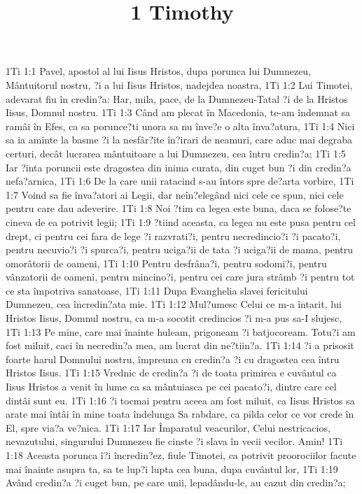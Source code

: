 

\title{1 Timothy}

1Ti 1:1  Pavel, apostol al lui Iisus Hristos, dupa porunca lui Dumnezeu, Mântuitorul nostru, ?i a lui Iisus Hristos, nadejdea noastra,
1Ti 1:2  Lui Timotei, adevarat fiu în credin?a: Har, mila, pace, de la Dumnezeu-Tatal ?i de la Hristos Iisus, Domnul nostru.
1Ti 1:3  Când am plecat în Macedonia, te-am îndemnat sa ramâi în Efes, ca sa porunce?ti unora sa nu înve?e o alta înva?atura,
1Ti 1:4  Nici sa ia aminte la basme ?i la nesfâr?ite în?irari de neamuri, care aduc mai degraba certuri, decât lucrarea mântuitoare a lui Dumnezeu, cea întru credin?a;
1Ti 1:5  Iar ?inta poruncii este dragostea din inima curata, din cuget bun ?i din credin?a nefa?arnica,
1Ti 1:6  De la care unii ratacind s-au întors spre de?arta vorbire,
1Ti 1:7  Voind sa fie înva?atori ai Legii, dar neîn?elegând nici cele ce spun, nici cele pentru care dau adeverire.
1Ti 1:8  Noi ?tim ca legea este buna, daca se folose?te cineva de ea potrivit legii;
1Ti 1:9  ?tiind aceasta, ca legea nu este pusa pentru cel drept, ci pentru cei fara de lege ?i razvrati?i, pentru necredincio?i ?i pacato?i, pentru necuvio?i ?i spurca?i, pentru uciga?ii de tata ?i uciga?ii de mama, pentru omorâtorii de oameni,
1Ti 1:10  Pentru desfrâna?i, pentru sodomi?i, pentru vânzatorii de oameni, pentru mincino?i, pentru cei care jura strâmb ?i pentru tot ce sta împotriva sanatoase,
1Ti 1:11  Dupa Evanghelia slavei fericitului Dumnezeu, cea încredin?ata mie.
1Ti 1:12  Mul?umesc Celui ce m-a întarit, lui Hristos Iisus, Domnul nostru, ca m-a socotit credincios ?i m-a pus sa-I slujesc,
1Ti 1:13  Pe mine, care mai înainte huleam, prigoneam ?i batjocoream. Totu?i am fost miluit, caci în necredin?a mea, am lucrat din ne?tiin?a.
1Ti 1:14  ?i a prisosit foarte harul Domnului nostru, împreuna cu credin?a ?i cu dragostea cea întru Hristos Iisus.
1Ti 1:15  Vrednic de credin?a ?i de toata primirea e cuvântul ca Iisus Hristos a venit în lume ca sa mântuiasca pe cei pacato?i, dintre care cel dintâi sunt eu.
1Ti 1:16  ?i tocmai pentru aceea am fost miluit, ca Iisus Hristos sa arate mai întâi în mine toata îndelunga Sa rabdare, ca pilda celor ce vor crede în El, spre via?a ve?nica.
1Ti 1:17  Iar Împaratul veacurilor, Celui nestricacios, nevazutului, singurului Dumnezeu fie cinste ?i slava în vecii vecilor. Amin!
1Ti 1:18  Aceasta porunca î?i încredin?ez, fiule Timotei, ca potrivit proorociilor facute mai înainte asupra ta, sa te lup?i lupta cea buna, dupa cuvântul lor,
1Ti 1:19  Având credin?a ?i cuget bun, pe care unii, lepadându-le, au cazut din credin?a;

